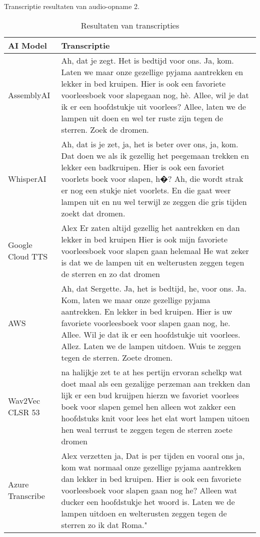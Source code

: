 \begin{table}[htbp]
    \centering
    \label{tab:results_sample2}
        \caption{Transcriptie resultaten van audio-opname 2.}
    \begin{tabularx}{\textwidth}{|l|X|}
    \hline
    \textbf{AI Model} & \textbf{Transcriptie} \\ \midrule
    
    AssemblyAI & Ah, dat je zegt. Het is bedtijd voor ons. Ja, kom. Laten we maar onze gezellige pyjama aantrekken en lekker in bed kruipen. Hier is ook een favoriete voorleesboek voor slapegaan nog, hè. Allee, wil je dat ik er een hoofdstukje uit voorlees? Allee, laten we de lampen uit doen en wel ter ruste zijn tegen de sterren. Zoek de dromen.
    \\ \hline
    
    WhisperAI &  Ah, dat is je zet, ja, het is beter over ons, ja, kom. Dat doen we als ik gezellig het peegemaan trekken en lekker een badkruipen. Hier is ook een favoriet voorlets boek voor slapen, h�? Ah, die wordt strak er nog een stukje niet voorlets. En die gaat weer lampen uit en nu wel terwijl ze zeggen die gris tijden zoekt dat dromen.
    
    \\ \hline
    
    Google Cloud TTS &    Alex Er zaten altijd gezellig het aantrekken en dan lekker in bed kruipen Hier is ook mijn favoriete voorleesboek voor slapen gaan helemaal He wat zeker is dat we de lampen uit en welterusten zeggen tegen de sterren en zo dat dromen
    
    \\ \hline
    
    AWS &      Ah, dat Sergette. Ja, het is bedtijd, he, voor ons. Ja. Kom, laten we maar onze gezellige pyjama aantrekken. En lekker in bed kruipen. Hier is uw favoriete voorleesboek voor slapen gaan nog, he. Allee. Wil je dat ik er een hoofdstukje uit voorlees. Allez. Laten we de lampen uitdoen. Wuis te zeggen tegen de sterren. Zoete dromen.
    
    \\ \hline
    
    Wav2Vec CLSR 53 &     na halijkje zet te at hes pertijn ervoran schelkp wat doet maal als een gezalijge perzeman aan trekken dan lijk er een bud kruijpen hierzn we favoriet voorlees boek voor slapen gemel hen alleen wot zakker een hoofdstuks knit voor lees het elat wort lampen uitoen hen weal terrust te zeggen tegen de sterren zoete dromen
    
    \\ \hline
    
    Azure Transcribe &   Alex verzetten ja, Dat is per tijden en vooral ons ja, kom wat normaal onze gezellige pyjama aantrekken dan lekker in bed kruipen. Hier is ook een favoriete voorleesboek voor slapen gaan nog he? Alleen wat ducker een hoofdstukje het woord is. Laten we de lampen uitdoen en welterusten zeggen tegen de sterren zo ik dat Roma."
    
    \\ \hline
\end{tabularx}
    \caption{Resultaten van transcripties}
\end{table}
\FloatBarrier


